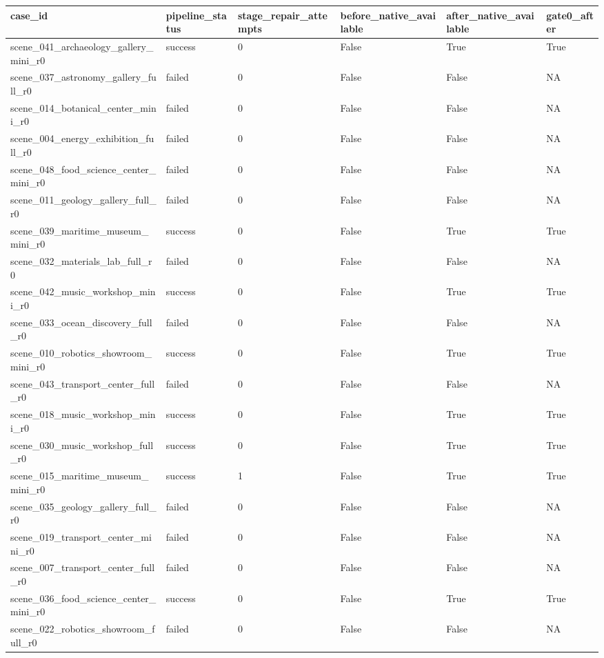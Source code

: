 \begin{tabular}{llllll}
\toprule
case\_id & pipeline\_status & stage\_repair\_attempts & before\_native\_available & after\_native\_available & gate0\_after \\
\midrule
scene\_041\_archaeology\_gallery\_mini\_r0 & success & 0 & False & True & True \\
scene\_037\_astronomy\_gallery\_full\_r0 & failed & 0 & False & False & NA \\
scene\_014\_botanical\_center\_mini\_r0 & failed & 0 & False & False & NA \\
scene\_004\_energy\_exhibition\_full\_r0 & failed & 0 & False & False & NA \\
scene\_048\_food\_science\_center\_mini\_r0 & failed & 0 & False & False & NA \\
scene\_011\_geology\_gallery\_full\_r0 & failed & 0 & False & False & NA \\
scene\_039\_maritime\_museum\_mini\_r0 & success & 0 & False & True & True \\
scene\_032\_materials\_lab\_full\_r0 & failed & 0 & False & False & NA \\
scene\_042\_music\_workshop\_mini\_r0 & success & 0 & False & True & True \\
scene\_033\_ocean\_discovery\_full\_r0 & failed & 0 & False & False & NA \\
scene\_010\_robotics\_showroom\_mini\_r0 & success & 0 & False & True & True \\
scene\_043\_transport\_center\_full\_r0 & failed & 0 & False & False & NA \\
scene\_018\_music\_workshop\_mini\_r0 & success & 0 & False & True & True \\
scene\_030\_music\_workshop\_full\_r0 & success & 0 & False & True & True \\
scene\_015\_maritime\_museum\_mini\_r0 & success & 1 & False & True & True \\
scene\_035\_geology\_gallery\_full\_r0 & failed & 0 & False & False & NA \\
scene\_019\_transport\_center\_mini\_r0 & failed & 0 & False & False & NA \\
scene\_007\_transport\_center\_full\_r0 & failed & 0 & False & False & NA \\
scene\_036\_food\_science\_center\_mini\_r0 & success & 0 & False & True & True \\
scene\_022\_robotics\_showroom\_full\_r0 & failed & 0 & False & False & NA \\

\end{tabular}
